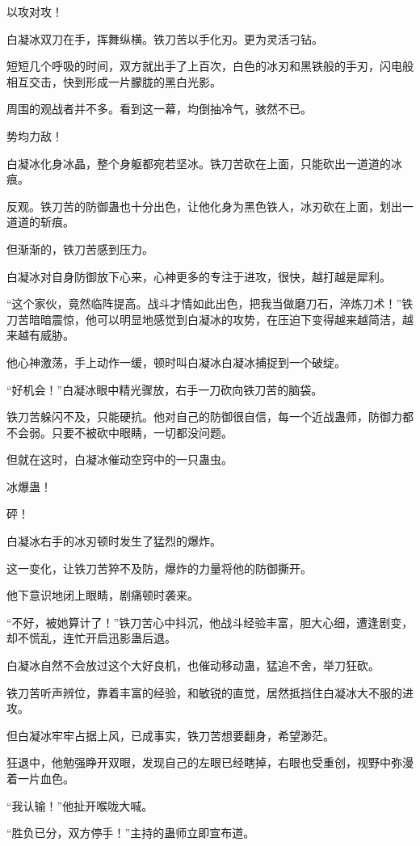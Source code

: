 \begin{this_body}
以攻对攻！

白凝冰双刀在手，挥舞纵横。铁刀苦以手化刃。更为灵活刁钻。

短短几个呼吸的时间，双方就出手了上百次，白色的冰刃和黑铁般的手刃，闪电般相互交击，快到形成一片朦胧的黑白光影。

周围的观战者并不多。看到这一幕，均倒抽冷气，骇然不已。

势均力敌！

白凝冰化身冰晶，整个身躯都宛若坚冰。铁刀苦砍在上面，只能砍出一道道的冰痕。

反观。铁刀苦的防御蛊也十分出色，让他化身为黑色铁人，冰刃砍在上面，划出一道道的斩痕。

但渐渐的，铁刀苦感到压力。

白凝冰对自身防御放下心来，心神更多的专注于进攻，很快，越打越是犀利。

“这个家伙，竟然临阵提高。战斗才情如此出色，把我当做磨刀石，淬炼刀术！”铁刀苦暗暗震惊，他可以明显地感觉到白凝冰的攻势，在压迫下变得越来越简洁，越来越有威胁。

他心神激荡，手上动作一缓，顿时叫白凝冰白凝冰捕捉到一个破绽。

“好机会！”白凝冰眼中精光骤放，右手一刀砍向铁刀苦的脑袋。

铁刀苦躲闪不及，只能硬抗。他对自己的防御很自信，每一个近战蛊师，防御力都不会弱。只要不被砍中眼睛，一切都没问题。

但就在这时，白凝冰催动空窍中的一只蛊虫。

冰爆蛊！

砰！

白凝冰右手的冰刃顿时发生了猛烈的爆炸。

这一变化，让铁刀苦猝不及防，爆炸的力量将他的防御撕开。

他下意识地闭上眼睛，剧痛顿时袭来。

“不好，被她算计了！”铁刀苦心中抖沉，他战斗经验丰富，胆大心细，遭逢剧变，却不慌乱，连忙开启迅影蛊后退。

白凝冰自然不会放过这个大好良机，也催动移动蛊，猛追不舍，举刀狂砍。

铁刀苦听声辨位，靠着丰富的经验，和敏锐的直觉，居然抵挡住白凝冰大不服的进攻。

但白凝冰牢牢占据上风，已成事实，铁刀苦想要翻身，希望渺茫。

狂退中，他勉强睁开双眼，发现自己的左眼已经瞎掉，右眼也受重创，视野中弥漫着一片血色。

“我认输！”他扯开喉咙大喊。

“胜负已分，双方停手！”主持的蛊师立即宣布道。


\end{this_body}
